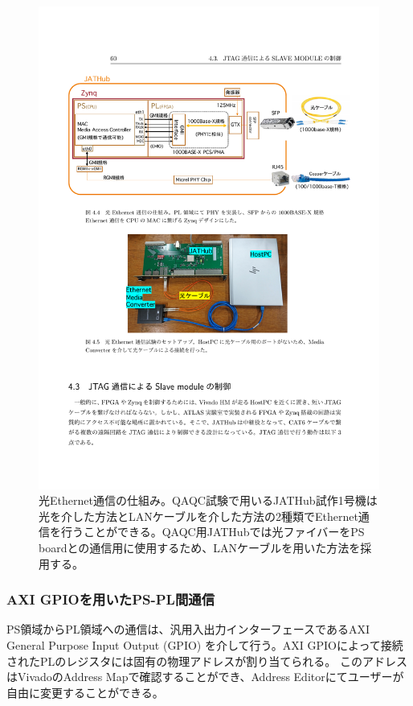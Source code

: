 \begin{figure} 
\centering
\includegraphics[width=16cm]{fig/QAQC/JATHub_ether.pdf}
\caption[光Ethernet通信の仕組み]{光Ethernet通信の仕組み\cite{mt_atanaka}。QAQC試験で用いるJATHub試作1号機は光を介した方法とLANケーブルを介した方法の2種類でEthernet通信を行うことができる。QAQC用JATHubでは光ファイバーをPS boardとの通信用に使用するため、LANケーブルを用いた方法を採用する。}
\label{JATHub_ether}
\end{figure}


\subsubsection{AXI GPIOを用いたPS-PL間通信}
\baselineskip
\label{subsubsec_axi}
PS領域からPL領域への通信は、汎用入出力インターフェースであるAXI General Purpose Input Output (GPIO) を介して行う。AXI GPIOによって接続されたPLのレジスタには固有の物理アドレスが割り当てられる。
このアドレスはVivadoのAddress Mapで確認することができ、Address Editorにてユーザーが自由に変更することができる。

